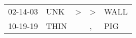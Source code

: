 \begin{supertabular}{p{0.07\textwidth}p{0.06\textwidth}p{0.02\textwidth}p{0.02\textwidth}p{0.06\textwidth}}
 02-14-03\textsuperscript{} &   UNK\textsuperscript{} &  \textgreater &  \textgreater &  WALL\textsuperscript{} \\
 10-19-19\textsuperscript{} &  THIN\textsuperscript{} &               &             , &   PIG\textsuperscript{} \\
\end{supertabular}
